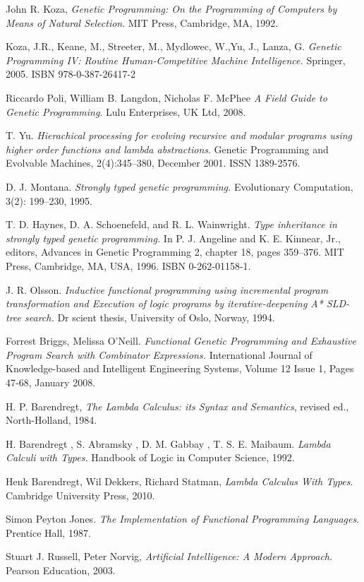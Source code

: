 \documentclass{llncs}
\begin{document}
\begin{thebibliography}{1}


  John R. Koza,
  \emph{Genetic Programming: On the Programming of Computers by Means of Natural Selection}.
  MIT Press, Cambridge, MA,
  1992. 

  Koza, J.R., Keane, M., Streeter, M., Mydlowec, W.,Yu, J., Lanza, G. 
  \emph{Genetic Programming IV: Routine Human-Competitive Machine Intelligence.} 
  Springer, 2005. ISBN 978-0-387-26417-2 

 Riccardo Poli, William B. Langdon, Nicholas F. McPhee
 \emph{A Field Guide to Genetic Programming}.
 Lulu Enterprises, UK Ltd, 2008.

  T. Yu. 
  \emph{Hierachical processing for evolving recursive and modular 
        programs using higher order functions and lambda abstractions}. 
  Genetic Programming and Evolvable Machines,
  2(4):345–380, December 2001. ISSN 1389-2576.


D. J. Montana. 
\emph{Strongly typed genetic programming.} 
Evolutionary Computation, 3(2): 199–230, 1995.

T. D. Haynes, D. A. Schoenefeld, and R. L. Wainwright. 
\emph{Type inheritance in strongly typed genetic programming.} 
In P. J. Angeline and K. E. Kinnear, Jr., editors, Advances
in Genetic Programming 2, chapter 18, pages 359–376.
MIT Press, Cambridge, MA, USA, 1996. ISBN 0-262-01158-1. 

J. R. Olsson. 
\emph{Inductive functional programming using incremental program 
transformation and Execution of logic programs by 
iterative-deepening A* SLD-tree search.} 
Dr scient thesis, University of Oslo, Norway, 1994.

Forrest Briggs, Melissa O’Neill.
\emph{Functional Genetic Programming and Exhaustive
Program Search with Combinator Expressions.}
International Journal of Knowledge-based and Intelligent Engineering Systems,
Volume 12 Issue 1, Pages 47-68, January 2008. 


H. P. Barendregt,
\emph{The Lambda Calculus: its Syntax and Semantics}, 
revised ed., North-Holland, 1984.

H. Barendregt , S. Abramsky , D. M. Gabbay , T. S. E. Maibaum.
\emph{Lambda Calculi with Types.} 
Handbook of Logic in Computer Science, 1992. 


  Henk Barendregt, Wil Dekkers, Richard Statman,
  \emph{Lambda Calculus With Types}.
  Cambridge University Press,
  2010. 

Simon Peyton Jones. 
\emph{The Implementation of Functional Programming Languages}. 
Prentice Hall, 1987.


	Stuart J. Russell, Peter Norvig,
	\emph{Artificial Intelligence: A Modern Approach}.
	Pearson Education,
	2003. 


\end{thebibliography}
\end{document}
